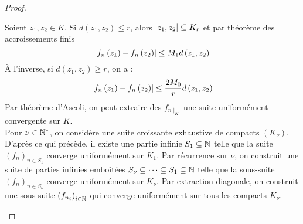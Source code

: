 \documentclass{cours}
\begin{document}
\begin{proof}
\begin{enumerate}
\begin{equation*}
        \end{equation*}
        Soient $z_{1}, z_{2} \in K$. Si $d\left(z_{1}, z_{2}\right) \leq r$, alors $\left|z_{1}, z_{2}\right| \subseteq K_{r}$ et par théorème des accroissements finis
        \begin{equation*}
            \left|f_{n}\left(z_{1}\right) - f_{n}\left(z_{2}\right)\right| \leq M_{1} d\left(z_{1}, z_{2}\right)
        \end{equation*}
        À l'inverse, si $d\left(z_{1}, z_{2}\right) \geq r$, on a : 
        \begin{equation*}
            \left|f_{n}\left(z_{1}\right) - f_{n}\left(z_{2}\right)\right| \leq \frac{2M_{0}}{r}d\left(z_{1}, z_{2}\right)
        \end{equation*}
        Par théorème d'Ascoli, on peut extraire des $f_{n\mid_{K}}$ une suite uniformément convergente sur $K$. \\
        Pour $\nu \in \mathbb{N}^{*}$, on considère une suite croissante exhaustive de compacts $\left(K_{\nu}\right)$. D'après ce qui précède, il existe une partie infinie $S_{1} \subseteq \mathbb{N}$ telle que la suite $\left(f_{n}\right)_{n \in S_{1}}$ converge uniformément sur $K_{1}$. Par récurrence sur $\nu$, on construit une suite de parties infinies emboîtées $S_{\nu} \subseteq \cdots \subseteq S_{1} \subseteq \mathbb{N}$ telle que la sous-suite $\left(f_{n}\right)_{n \in S_{\nu}}$ converge uniformément sur $K_{\nu}$. Par extraction diagonale, on construit une sous-suite $\left(f_{n_{i}}\right)_{i \in \mathbb{N}}$ qui converge uniformément sur tous les compacts $K_{\nu}$.
	\end{enumerate}
\end{proof}
\end{document}
